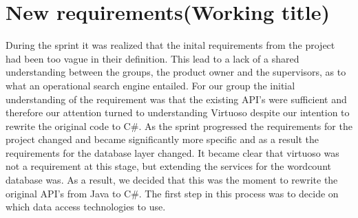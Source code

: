\section*{New requirements(Working title)}

During the sprint it was realized that the inital requirements from the \knox{} project had been too vague in their definition. This lead to a lack of a shared understanding between the groups, the product owner and the supervisors, as to what an operational search engine entailed. For our group the initial understanding of the requirement was that the existing API's were sufficient and therefore our attention turned to understanding Virtuoso despite our intention to rewrite the original code to C#. 
As the sprint progressed the requirements for the \knox{} project changed and became significantly more specific and as a result the requirements for the database layer changed. It became clear that virtuoso was not a requirement at this stage, but extending the services for the wordcount database was. As a result, we decided that this was the moment to rewrite the original API's from Java to C#.
The first step in this process was to decide on which data access technologies to use.



